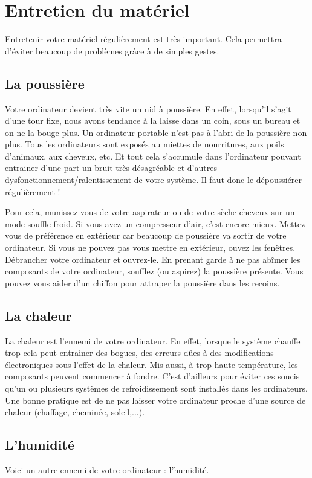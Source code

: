 \documentclass[12pt]{book}
\begin{document}
	\section{Entretien du matériel}
		Entretenir votre matériel régulièrement est très important. 
		Cela permettra d'éviter beaucoup de problèmes grâce à de simples gestes.
		\subsection{La poussière}
			Votre ordinateur devient très vite un nid à poussière.
			En effet, lorsqu'il s'agit d'une tour fixe, nous avons tendance à la laisse dans un coin, sous un bureau et on ne la bouge plus.
			Un ordinateur portable n'est pas à l'abri de la poussière non plus.
			Tous les ordinateurs sont exposés au miettes de nourritures, aux poils d'animaux, aux cheveux, etc. Et tout cela s'accumule dans l'ordinateur pouvant entrainer d'une part un bruit très désagréable et d'autres dysfonctionnement/ralentissement de votre système.
			Il faut donc le dépoussiérer régulièrement !\par
			Pour cela, munissez-vous de votre aspirateur ou de votre sèche-cheveux sur un mode souffle froid.
			Si vous avez un compresseur d'air, c'est encore mieux.
			Mettez vous de préférence en extérieur car beaucoup de poussière va sortir de votre ordinateur.
			Si vous ne pouvez pas vous mettre en extérieur, ouvez les fenêtres.
			Débrancher votre ordinateur et ouvrez-le.
			En prenant garde à ne pas abîmer les composants de votre ordinateur, soufflez (ou aspirez) la poussière présente.
			Vous pouvez vous aider d'un chiffon pour attraper la poussière dans les recoins.
		\subsection{La chaleur}
			La chaleur est l'ennemi de votre ordinateur.
			En effet, lorsque le système chauffe trop cela peut entrainer des bogues, des erreurs dûes à des modifications électroniques sous l'effet de la chaleur.
			Mis aussi, à trop haute température, les composants peuvent commencer à fondre.
			C'est d'ailleurs pour éviter ces soucis qu'un ou plusieurs systèmes de refroidissement sont installés dans les ordinateurs. 
			Une bonne pratique est de ne pas laisser votre ordinateur proche d'une source de chaleur (chaffage, cheminée, soleil,...). 
		\subsection{L'humidité}
			Voici un autre ennemi de votre ordinateur : l'humidité.
			
\end{document}
